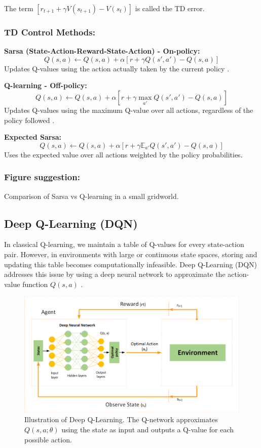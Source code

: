 \documentclass[../Main.tex]{subfiles}
\begin{document}
The term $[r_{t+1} + \gamma V(s_{t+1}) - V(s_t)]$ is called the TD error.

\subsubsection{TD Control Methods:}

\textbf{Sarsa (State-Action-Reward-State-Action) - On-policy:}
\[
Q(s,a) \leftarrow Q(s,a) + \alpha \left[ r + \gamma Q(s',a') - Q(s,a) \right]
\]
Updates Q-values using the action actually taken by the current policy \cite{rummery1994line}.

\textbf{Q-learning - Off-policy:}
\[
Q(s,a) \leftarrow Q(s,a) + \alpha \left[ r + \gamma \max_{a'} Q(s',a') - Q(s,a) \right]
\]
Updates Q-values using the maximum Q-value over all actions, regardless of the policy followed \cite{watkins1989learning}.

\textbf{Expected Sarsa:}
\[
Q(s,a) \leftarrow Q(s,a) + \alpha \left[ r + \gamma \mathbb{E}_{a'} Q(s',a') - Q(s,a) \right]
\]
Uses the expected value over all actions weighted by the policy probabilities.

\subsubsection{Figure suggestion:} Comparison of Sarsa vs Q-learning in a small gridworld.

\subsection{Deep Q-Learning (DQN)}

In classical Q-learning, we maintain a table of Q-values for every state-action pair. However, in environments with large or continuous state spaces, storing and updating this table becomes computationally infeasible. Deep Q-Learning (DQN) addresses this issue by using a deep neural network to approximate the action-value function $Q(s, a)$ \cite{mnih2015human}.

\begin{figure}[H]
    \centering
    \includegraphics[width=1\textwidth]{img/dqn.png}
    \caption{Illustration of Deep Q-Learning. The Q-network approximates $Q(s, a; \theta)$ using the state as input and outputs a Q-value for each possible action.}
\end{figure}
\end{document}

